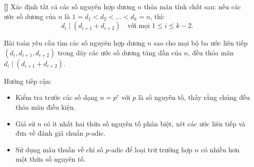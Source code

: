 \documentclass[../06-largest-exponent.tex]{subfiles}
\begin{document}
\begin{example*}\label{example:IMO-2023-P1}\textbf{[]}
    Xác định tất cả các số nguyên hợp dương \( n \) thỏa mãn tính chất sau: nếu các ước số dương của \( n \) là \( 1 = d_1 < d_2 < \dots < d_k = n \), thì:
    \[
        d_i \mid (d_{i+1} + d_{i+2}) \quad \text{với mọi } 1 \leq i \leq k - 2.
    \]
\end{example*}

\begin{story*}
    Bài toán yêu cầu tìm các số nguyên hợp dương \( n \) sao cho mọi bộ ba ước liên tiếp \( (d_i, d_{i+1}, d_{i+2}) \) trong dãy các ước số dương tăng dần của \( n \), đều thỏa mãn \( d_i \mid (d_{i+1} + d_{i+2}) \).

    Hướng tiếp cận:
    \begin{itemize}[topsep=0pt, partopsep=0pt, itemsep=0pt]
        \item Kiểm tra trước các số dạng \( n = p^r \) với \( p \) là số nguyên tố, thấy rằng chúng đều thỏa mãn điều kiện.
        \item Giả sử \( n \) có ít nhất hai thừa số nguyên tố phân biệt, xét các ước liên tiếp và đưa về đánh giá chuẩn \( p \)-adic.
        \item Sử dụng mâu thuẫn về chỉ số \( p \)-adic để loại trừ trường hợp \( n \) có nhiều hơn một thừa số nguyên tố.
    \end{itemize}
\end{story*}
\end{document}
